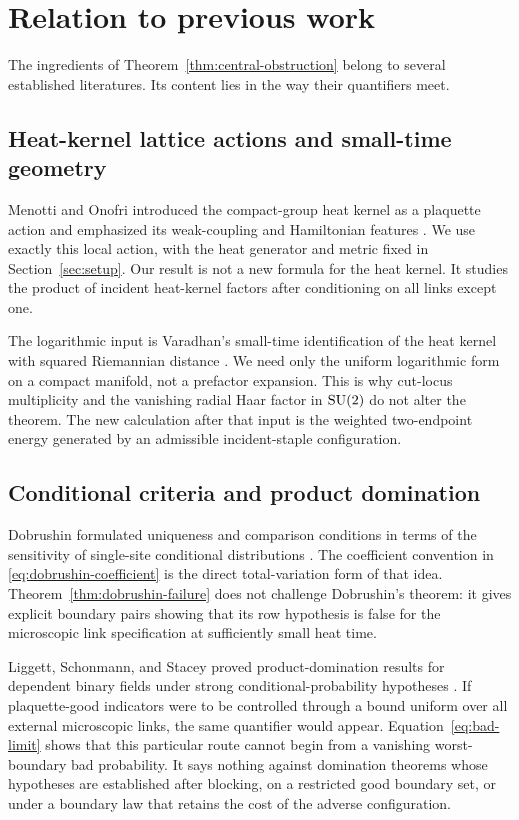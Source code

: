 \section{Relation to previous work}\label{sec:related}

The ingredients of Theorem~\ref{thm:central-obstruction} belong to several
established literatures.  Its content lies in the way their quantifiers meet.

\subsection{Heat-kernel lattice actions and small-time geometry}

Menotti and Onofri introduced the compact-group heat kernel as a plaquette
action and emphasized its weak-coupling and Hamiltonian features
\cite{MenottiOnofri1981}.  We use exactly this local action, with the heat
generator and metric fixed in Section~\ref{sec:setup}.  Our result is not a
new formula for the heat kernel.  It studies the product of incident
heat-kernel factors after conditioning on all links except one.

The logarithmic input is Varadhan's small-time identification of the heat
kernel with squared Riemannian distance
\cite{Varadhan1967Fundamental,Varadhan1967Diffusion}.  We need only the
uniform logarithmic form on a compact manifold, not a prefactor expansion.
This is why cut-locus multiplicity and the vanishing radial Haar factor in
$\mathrm{SU}(2)$ do not alter the theorem.  The new calculation after that input is
the weighted two-endpoint energy generated by an admissible incident-staple
configuration.

\subsection{Conditional criteria and product domination}

Dobrushin formulated uniqueness and comparison conditions in terms of the
sensitivity of single-site conditional distributions
\cite{Dobrushin1968}.  The coefficient convention in
\eqref{eq:dobrushin-coefficient} is the direct total-variation form of that
idea.  Theorem~\ref{thm:dobrushin-failure} does not challenge Dobrushin's
theorem: it gives explicit boundary pairs showing that its row hypothesis is
false for the microscopic link specification at sufficiently small heat
time.

Liggett, Schonmann, and Stacey proved product-domination results for dependent
binary fields under strong conditional-probability hypotheses
\cite{LiggettSchonmannStacey1997}.  If plaquette-good indicators were to be
controlled through a bound uniform over all external microscopic links, the
same quantifier would appear.  Equation~\eqref{eq:bad-limit} shows that this
particular route cannot begin from a vanishing worst-boundary bad probability.
It says nothing against domination theorems whose hypotheses are established
after blocking, on a restricted good boundary set, or under a boundary law
that retains the cost of the adverse configuration.

